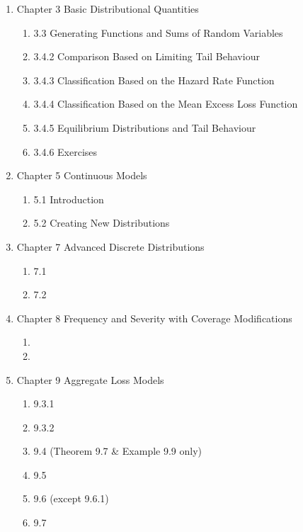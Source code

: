 \documentclass[hidelinks, 12pt]{article}
\theoremstyle{mydefstyle}
\theoremstyle{mythmstyle}
\begin{document}
\begin{enumerate}[label=]

\item Chapter 3 Basic Distributional Quantities
\begin{enumerate}[label=]
\item 3.3 Generating Functions and Sums of Random Variables
\item 3.4.2 Comparison Based on Limiting Tail Behaviour
\item 3.4.3 Classification Based on the Hazard Rate Function
\item 3.4.4 Classification Based on the Mean Excess Loss Function
\item 3.4.5 Equilibrium Distributions and Tail Behaviour
\item 3.4.6 Exercises
\end{enumerate}

\item Chapter 5 Continuous Models
\begin{enumerate}[label=]
\item 5.1 Introduction
\item 5.2 Creating New Distributions
\end{enumerate}

\item Chapter 7 Advanced Discrete Distributions
\begin{enumerate}[label=]
\item 7.1
\item 7.2
\end{enumerate}

\item Chapter 8 Frequency and Severity with Coverage Modifications
\begin{enumerate}[label=]
\item 
\item 
\end{enumerate}

\item Chapter 9 Aggregate Loss Models
\begin{enumerate}[label=]
\item 9.3.1
\item 9.3.2
\item 9.4 (Theorem 9.7 \& Example 9.9 only)
\item 9.5
\item 9.6 (except 9.6.1)
\item 9.7
\end{enumerate}


\end{enumerate}
\end{document}

